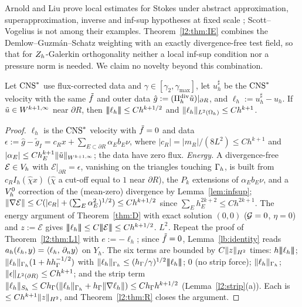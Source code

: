 Arnold and Liu prove local estimates for Stokes under abstract approximation, superapproximation, inverse and inf-sup hypotheses at fixed scale \cite{ArnoldLiu1995}; Scott--Vogelius is not among their examples. Theorem~\ref{l2:thm:IE} combines the Demlow--Guzm\'an--Schatz weighting with an exactly divergence-free test field, so that for $Z_h$-Galerkin orthogonality neither a local inf-sup condition nor a pressure norm is needed. We claim no novelty beyond this combination.

\begin{lemma}\label{l2:lem:shift}
Let $\mathrm{CNS}^\ast$ use flux-corrected data and $\gamma\in[\gamma_2,\gamma_{\max}]$, let $u_h^\sharp$ be the $\mathrm{CNS}^\ast$ velocity with the same $\tilde f$ and outer data $\hat g:=(\Pi^{\rm div}_h\tilde u)|_{\partial R}$, and $\ell_h:=u_h^\sharp-u_h$. If $\tilde u\in W^{k+1,\infty}$ near $\partial R$, then $|\!|\!|\ell_h|\!|\!|\le Ch^{k+1/2}$ and $\lVert \ell_h\rVert_{L^2(\Omega_h)}\le Ch^{k+1}$.
\end{lemma}

\begin{proof}
$\ell_h$ is the $\mathrm{CNS}^\ast$ velocity with $\tilde f=0$ and data $\epsilon:=\hat g-\tilde g_I=c_Rx+\sum_{E\subset\partial R}\alpha_Eb_E\nu$, where $|c_R|=|m_R|/(8L^2)\le Ch^{k+1}$ and $|\alpha_E|\le Ch_E^{k+1}\lVert \tilde u\rVert_{W^{k+1,\infty}}$; the data have zero flux. \emph{Energy.} A divergence-free $\mathcal E\in V_h$ with $\mathcal E|_{\partial R}=\epsilon$, vanishing on the triangles touching $\Gamma_h$, is built from $c_RI_h(\hat\chi x)$ ($\hat\chi$ a cut-off equal to $1$ near $\partial R$), the $P_k$ extensions of $\alpha_Eb_E\nu$, and a $V_h^0$ correction of the (mean-zero) divergence by Lemma~\ref{lem:infsup}; $\lVert \nabla\mathcal E\rVert\le C(|c_R|+(\sum_E\alpha_E^2)^{1/2})\le Ch^{k+1/2}$ since $\sum_Eh_E^{2k+2}\le Ch^{2k+1}$. The energy argument of Theorem~\ref{thm:D} with exact solution $(0,0)$ ($\mathcal G=0$, $\eta=0$) and $z:=\mathcal E$ gives $\tnorm{\ell_h}\le C\tnorm{\mathcal E}\le Ch^{k+1/2}$. \emph{$L^2$.} Repeat the proof of Theorem~\ref{l2:thm:L1} with $e:=-\ell_h$; since $\tilde f=0$, Lemma~\ref{lb:identity} reads $a_h(\ell_h,y)=\langle \ell_h,\, \partial_n y\rangle$ on $Y_h$. The six terms are bounded by $C\lVert z\rVert_{H^2}$ times: $h|\!|\!|\ell_h|\!|\!|$; $\lVert \ell_h\rVert_{\Gamma_h}(1+hh_\Gamma^{-1/2})$ with $\lVert \ell_h\rVert_{\Gamma_h}\le(h_\Gamma/\gamma)^{1/2}|\!|\!|\ell_h|\!|\!|$; $0$ (no strip force); $\lVert \ell_h\rVert_{\Gamma_h}$; $\lVert \epsilon\rVert_{L^2(\partial R)}\le Ch^{k+1}$; and the strip term $\lVert \ell_h\rVert_{S_h}\le Ch_\Gamma(\lVert \ell_h\rVert_{\Gamma_h}+h_\Gamma\lVert \nabla\ell_h\rVert)\le Ch_\Gamma h^{k+1/2}$ (Lemma~\ref{l2:strip}(a)). Each is $\le Ch^{k+1}\lVert z\rVert_{H^2}$, and Theorem~\ref{l2:thm:R} closes the argument.
\end{proof}


